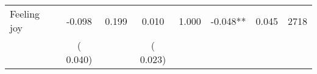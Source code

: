 \begin{tabular}{l*{7}{c}}
 Feeling joy       &             -0.098       &        0.199  &              0.010       &        1.000  &             -0.048**       &              0.045 &  2718 \\ 
                       &       (       0.040)             &                               &       (       0.023)                     &                               &                                               &                                &                      \\ 

\hline \end{tabular}
